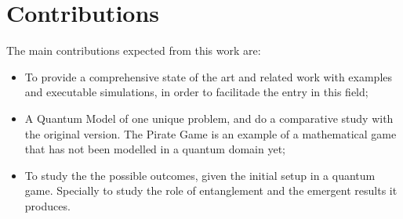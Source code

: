 \section{Contributions}
\label{sec:int_contributions}

The main contributions expected from this work are:

\begin{itemize}

\item To provide a comprehensive state of the art and related work with examples and executable simulations, in order to facilitade the entry in this field;

\item A Quantum Model of one unique problem, and do a comparative study with the original version. The Pirate Game is an example of a mathematical game that has not been modelled in a quantum domain yet;

\item To study the the possible outcomes, given the initial setup in a quantum game. Specially to study the role of entanglement and the emergent results it produces.


\end{itemize}